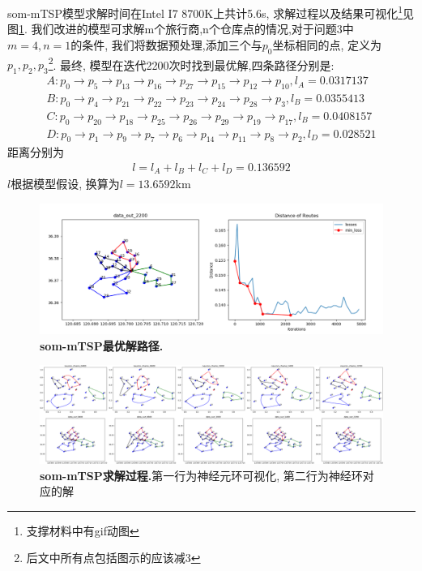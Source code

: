 som-mTSP模型求解时间在Intel I7 8700K上共计5.6s, 求解过程以及结果可视化\footnote{支撑材料中有gif动图}见图\ref{fig:mtsp-solution}. 我们改进的模型可求解m个旅行商,n个仓库点的情况,对于问题3中$m=4, n=1$的条件, 我们将数据预处理,添加三个与$p_0$坐标相同的点, 定义为$p_1,p_2,p_3$\footnote{后文中所有点包括图示的应该减3}.
最终, 模型在迭代2200次时找到最优解,四条路径分别是:
\begin{eqnarray}
    \nonumber
   A: p_0 \rightarrow p_5 \rightarrow p_{13} \rightarrow p_{16} \rightarrow p_{27} \rightarrow p_{15} \rightarrow p_{12} \rightarrow p_{10}, l_A=0.0317137\\
    \nonumber
  B:  p_0 \rightarrow p_{4} \rightarrow p_{21} \rightarrow p_{22} \rightarrow p_{23} \rightarrow p_{24} \rightarrow p_{28} \rightarrow p_{3}, l_B=0.0355413\\
    \nonumber
   C: p_{0} \rightarrow p_{20} \rightarrow p_{18} \rightarrow p_{25} \rightarrow p_{26} \rightarrow p_{29} \rightarrow p_{19} \rightarrow p_{17}, l_B=0.0408157\\
    \nonumber
    D: p_{0}\rightarrow p_{1}\rightarrow p_{9}  \rightarrow p_{7} \rightarrow p_{6} \rightarrow p_{14} \rightarrow p_{11} \rightarrow p_{8} \rightarrow p_{2}, l_D=0.028521
\end{eqnarray}
距离分别为
\begin{eqnarray}
    &l = l_A+l_B+l_C+l_D = 0.136592&
\end{eqnarray}
$l$根据模型假设, 换算为$l= 13.6592$km

\begin{figure}[h]
    \begin{center}
        \includegraphics[width=0.95\linewidth]{fig/solution2}
    \end{center}
    \caption{\textbf{som-mTSP最优解路径.} }
        \label{fig:mtsp-solution}
  \end{figure}


\begin{figure}[h]
    \begin{center}
        \includegraphics[width=1.0\linewidth]{fig/iteration2}
    \end{center}
    \caption{\textbf{som-mTSP求解过程.}第一行为神经元环可视化, 第二行为神经环对应的解} 
        \label{fig:iteration}
  \end{figure}

